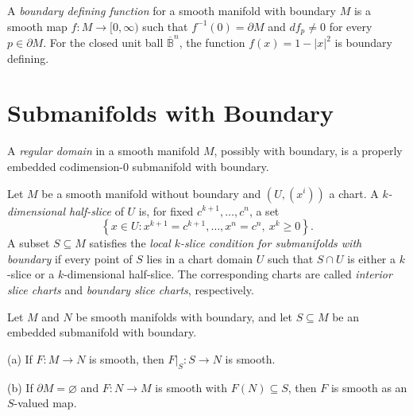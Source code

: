\begin{definition}
\label{def:5-35-extra-3}




A \emph{boundary defining function} for a smooth manifold with boundary $M$ is
a smooth map $f:M\to[0,\infty)$ such that $f^{-1}(0)=\partial M$ and
$df_p\neq0$ for every $p\in\partial M$. For the closed unit ball
$\overline{\mathbb B}^n$, the function $f(x)=1-|x|^2$ is boundary defining.
\end{definition}


\section{Submanifolds with Boundary}

\begin{definition}
\label{def:5-36-extra-2}




A \emph{regular domain} in a smooth manifold $M$, possibly with boundary, is a
properly embedded codimension-$0$ submanifold with boundary.
\end{definition}

\begin{definition}
\label{def:5-36-extra-4}




Let $M$ be a smooth manifold without boundary and $(U,(x^i))$ a chart. A
\emph{$k$-dimensional half-slice} of $U$ is, for fixed
$c^{k+1},\ldots,c^n$, a set
\[
\left\{x\in U:x^{k+1}=c^{k+1},\ldots,x^n=c^n,\ x^k\geq0\right\}.
\]
A subset $S\subseteq M$ satisfies the \emph{local $k$-slice condition for
submanifolds with boundary} if every point of $S$ lies in a chart domain $U$
such that $S\cap U$ is either a $k$-slice or a $k$-dimensional half-slice. The
corresponding charts are called \emph{interior slice charts} and
\emph{boundary slice charts}, respectively.
\end{definition}


\begin{theorem}
\label{thm:5-53}




Let $M$ and $N$ be smooth manifolds with boundary, and let $S\subseteq M$ be an
embedded submanifold with boundary.

(a) If $F:M\to N$ is smooth, then $F|_S:S\to N$ is smooth.

(b) If $\partial M=\varnothing$ and $F:N\to M$ is smooth with $F(N)\subseteq
S$, then $F$ is smooth as an $S$-valued map.
\end{theorem}

